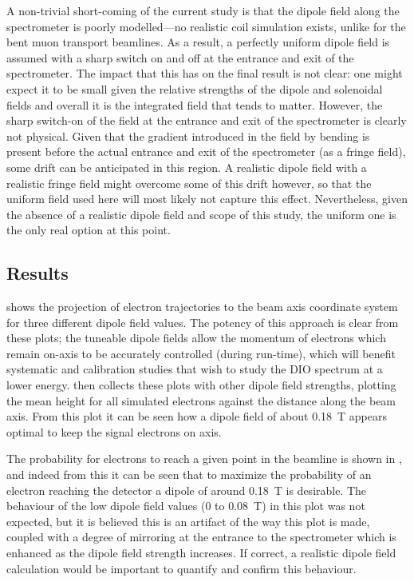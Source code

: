 A non-trivial short-coming of the current study is that the dipole field along the spectrometer is poorly modelled---no realistic coil simulation exists, unlike for the bent muon transport beamlines.
As a result, a perfectly uniform dipole field is assumed with a sharp switch on and off at the entrance and exit of the spectrometer.
The impact that this has on the final result is not clear: one might expect it to be small given the relative strengths of the dipole and solenoidal fields and overall it is the integrated field that tends to matter.
However, the sharp switch-on of the field at the entrance and exit of the spectrometer is clearly not physical.
Given that the gradient introduced in the field by bending is present before the actual entrance and exit of the spectrometer (as a fringe field), some drift can be anticipated in this region.
A realistic dipole field with a realistic fringe field might overcome some of this drift however, so that the uniform field used here will most likely not capture this effect.
Nevertheless, given the absence of a realistic dipole field and scope of this study, the uniform one is the only real option at this point.

\subsection{Results}
\FigOptimESTDipoleBeamHeightTwoD
\FigOptimESTDipoleBeamHeightMean
{} shows the projection of electron trajectories to the beam axis coordinate system for three different dipole field values.
The potency of this approach is clear from these plots; the tuneable dipole fields allow the momentum of electrons which remain on-axis to be accurately controlled (during run-time), which will benefit systematic and calibration studies that wish to study the \ac{DIO} spectrum at a lower energy.
 then collects these plots with other dipole field strengths, plotting the mean height for all simulated electrons against the distance along the beam axis.
From this plot it can be seen how a dipole field of about 0.18~T appears optimal to keep the signal electrons on axis.

The probability for electrons to reach a given point in the beamline is shown in , and indeed from this it can be seen that to maximize the probability of an electron reaching the detector
a dipole of around 0.18~T is desirable.
The behaviour of the low dipole field values (0 to 0.08~T) in this plot was not expected, but it is believed this is an artifact of the way this plot is made, coupled with a degree of mirroring at the entrance to the spectrometer which is enhanced as the dipole field strength increases.
If correct, a realistic dipole field calculation would be important to quantify and confirm this behaviour.
\FigOptimESTDipoleBeamFluxMean

